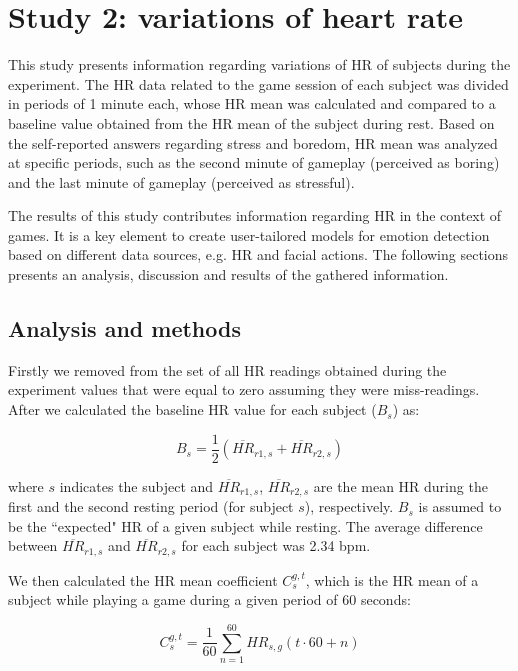 \section{Study 2: variations of heart rate}

This study presents information regarding variations of HR of subjects during the experiment. The HR data related to the game session of each subject was divided in periods of 1 minute each, whose HR mean was calculated and compared to a baseline value obtained from the HR mean of the subject during rest. Based on the self-reported answers regarding stress and boredom, HR mean was analyzed at specific periods, such as the second minute of gameplay (perceived as boring) and the last minute of gameplay (perceived as stressful).

The results of this study contributes information regarding HR in the context of games. It is a key element to create user-tailored models for emotion detection based on different data sources, e.g. HR and facial actions. The following sections presents an analysis, discussion and results of the gathered information.

\subsection{Analysis and methods}

Firstly we removed from the set of all HR readings obtained during the experiment values that were equal to zero assuming they were miss-readings. After we calculated the baseline HR value for each subject ($B_s$) as:

\begin{equation} \label{eq:baseline}
B_s = \frac{1}{2}(\overline{HR}_{r1,s} + \overline{HR}_{r2,s})
\end{equation}

where $s$ indicates the subject and $\overline{HR}_{r1,s}$, $\overline{HR}_{r2,s}$ are the mean HR during the first and the second resting period (for subject $s$), respectively. $B_s$ is assumed to be the ``expected" HR of a given subject while resting. The average difference between $\overline{HR}_{r1,s}$ and $\overline{HR}_{r2,s}$ for each subject was 2.34 bpm.

We then calculated the HR mean coefficient $C_s^{g,t}$, which is the HR mean of a subject while playing a game during a given period of 60 seconds:

\begin{equation} \label{eq:variation}
C_s^{g,t} = \frac{1}{60}\sum_{n=1}^{60} HR_{s,g}(t\cdot 60 + n)
\end{equation}


